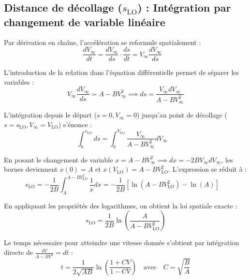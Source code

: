 	
		\vspace*{1cm}
		
		
		\subsection{Distance de décollage ($s_{\text{LO}}$) : Intégration par changement de variable linéaire}
		
			Par dérivation en chaîne, l'accélération se reformule spatialement :
			\begin{equation}
				\frac{dV_\infty}{dt} = \frac{dV_\infty}{ds} \cdot \frac{ds}{dt} = V_\infty\frac{dV_\infty}{ds} \quad 
			\end{equation}
			
			L'introduction de la relation  dans l'équation différentielle  permet de séparer les variables :
			\begin{equation}
				V_\infty\frac{dV_\infty}{ds} = A - BV_\infty^2 \implies ds = \frac{V_\infty dV_\infty}{A - BV_\infty^2} 
			\end{equation}
			
			L'intégration depuis le départ ($s=0, V_\infty=0$) jusqu'au point de décollage ($s=s_{\text{LO}}, V_\infty=V_{\text{LO}}$) s'énonce :
			\begin{equation}
				\int_{0}^{s_{\text{LO}}} ds = \int_{0}^{V_{\text{LO}}} \frac{V_\infty}{A - BV_\infty^2} dV_\infty \quad 
			\end{equation}
			
			En posant le changement de variable $x = A - BV_\infty^2 \implies dx = -2BV_\infty dV_\infty$, les bornes deviennent $x(0) = A$ et $x(V_{\text{LO}}) = A - BV_{\text{LO}}^2$. L'expression se réduit à :
			\begin{equation}
				s_{\text{LO}} = -\frac{1}{2B} \int_{A}^{A - BV_{\text{LO}}^2} \frac{1}{x} dx = -\frac{1}{2B} \left[\ln\left(A - BV_{\text{LO}}^2\right) - \ln(A)\right] \quad 
			\end{equation}
			
			En appliquant les propriétés des logarithmes, on obtient la loi spatiale exacte :
			\begin{equation}
				s_{\text{LO}} = \frac{1}{2B}\ln\left(\frac{A}{A - BV_{\text{LO}}^2}\right)
			\end{equation}
			
			Le temps nécessaire pour atteindre une vitesse donnée s'obtient par intégration directe de $\frac{dV}{A-BV^2} = dt$ :
			\begin{equation}
				t = \frac{1}{2\sqrt{AB}}\ln\left(\frac{1 + CV}{1 - CV}\right) \quad \text{avec} \quad C = \sqrt{\frac{B}{A}} 
			\end{equation}
			
